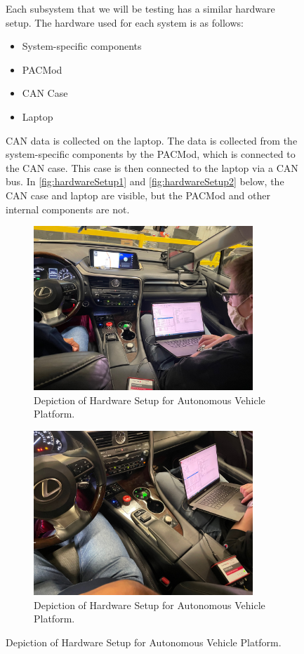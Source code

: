 \documentclass[12pt]{article} %
\begin{document}
\begin{figure}
Each subsystem that we will be testing has a similar hardware setup. The hardware used for each system is as follows:
\begin{itemize}
	\item System-specific components
	\item PACMod
	\item CAN Case
	\item Laptop
\end{itemize}
CAN data is collected on the laptop. The data is collected from the system-specific components by the PACMod, which is connected to the CAN case. This case is then connected to the laptop via a CAN bus. In \autoref{fig:hardwareSetup1} and \autoref{fig:hardwareSetup2} below, the CAN case and laptop are visible, but the PACMod and other internal components are not. 
%
\begin{figure}[h]
    \centering
    \captionsetup{justification=centering, margin=3cm}
    \includegraphics[width=3.25in]{figs/img/picturesVisitToAStuff/dataColletionSetup1-20211007}
    \caption{Depiction of Hardware Setup for Autonomous Vehicle Platform.}
    \label{fig:hardwareSetup1}
\end{figure}\begin{figure}[h]
    \centering
    \captionsetup{justification=centering, margin=3cm}
    \includegraphics[angle=180,width=3.25in]{figs/img/picturesVisitToAStuff/dataColletionSetup2-20211007}
    \caption{Depiction of Hardware Setup for Autonomous Vehicle Platform.}
    \label{fig:hardwareSetup2}
\end{figure}
%


\end{figure}
\end{document}
